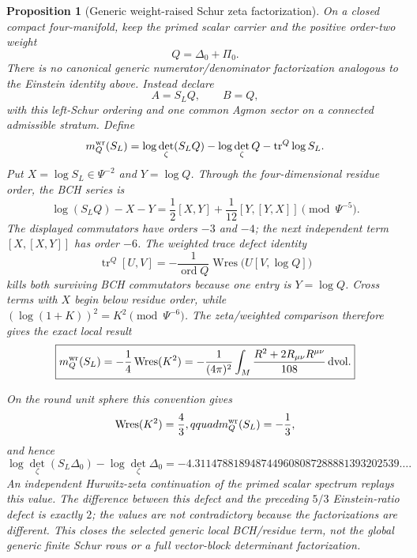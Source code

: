 \documentclass[11pt]{article}
\newtheorem{proposition}[theorem]{Proposition}
\theoremstyle{definition}
\theoremstyle{remark}
\newcommand{\dd}{\mathrm d}
\begin{document}
\begin{proposition}[Generic weight-raised Schur zeta factorization]
On a closed compact four-manifold, keep the primed scalar carrier and the
positive order-two weight
\[
 Q=\Delta_0+\Pi_0.
\]
There is no canonical generic numerator/denominator factorization analogous
to the Einstein identity above.  Instead declare
\[
 A=S_LQ,\qquad B=Q,
\]
with this left-Schur ordering and one common Agmon sector on a connected
admissible stratum.  Define
\[
 m_Q^{\rm wr}(S_L)=\log\det_\zeta(S_LQ)-\log\det_\zeta Q
                   -\operatorname{tr}^Q\log S_L.
\]
Put $X=\log S_L\in\Psi^{-2}$ and $Y=\log Q$.  Through the
four-dimensional residue order, the BCH series is
\[
 \log(S_LQ)-X-Y
 =\frac12[X,Y]+\frac1{12}[Y,[Y,X]]\pmod{\Psi^{-5}}.
\]
The displayed commutators have orders $-3$ and $-4$; the next independent
term $[X,[X,Y]]$ has order $-6$.  The weighted trace defect identity
\[
 \operatorname{tr}^Q[U,V]
 =-\frac1{\operatorname{ord}Q}
   \operatorname{Wres}\bigl(U[V,\log Q]\bigr)
\]
kills both surviving BCH commutators because one entry is $Y=\log Q$.
Cross terms with $X$ begin below residue order, while
$(\log(1+K))^2=K^2\pmod{\Psi^{-6}}$.  The zeta/weighted comparison therefore
gives the exact local result
\[
 \boxed{
 m_Q^{\rm wr}(S_L)=-\frac14\operatorname{Wres}(K^2)
 =-\frac1{(4\pi)^2}\int_M
 \frac{R^2+2R_{\mu\nu}R^{\mu\nu}}{108}\,\dd\mathrm{vol}.}
\]

On the round unit sphere this convention gives
\[
 \operatorname{Wres}(K^2)=\frac43,qquad
 m_Q^{\rm wr}(S_L)=-\frac13,
\]
and hence
\[
 \log\det_\zeta(S_L\Delta_0)-\log\det_\zeta\Delta_0
 =-4.3114788189487449608087288881393202539\ldots .
\]
An independent Hurwitz-zeta continuation of the primed scalar spectrum
replays this value.  The difference between this defect and the preceding
$5/3$ Einstein-ratio defect is exactly $2$; the values are not contradictory
because the factorizations are different.  This closes the selected generic
local BCH/residue term, not the global generic finite Schur rows or a full
vector-block determinant factorization.
\end{proposition}
\end{document}
